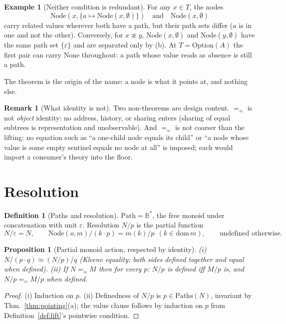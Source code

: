 \documentclass[11pt]{article}
\newtheorem{proposition}[theorem]{Proposition}
\theoremstyle{definition}
\newtheorem{definition}[theorem]{Definition}
\newtheorem{example}[theorem]{Example}
\newtheorem{remark}[theorem]{Remark}
\newcommand{\Bytes}{\mathbb{B}}                    %
\newcommand{\dom}{\mathrm{dom}\,}
\newcommand{\eqS}{=_{\approx}}                     %
\newcommand{\Paths}{\mathrm{Paths}}
\begin{document}
\begin{example}[Neither condition is redundant]
For any $x \in T$, the nodes
\[
\mathrm{Node}(x, \{a \mapsto \mathrm{Node}(x, \emptyset)\})
\quad\text{and}\quad \mathrm{Node}(x, \emptyset)
\]
carry related values wherever both have a path, but their path sets differ ($a$ is in
one and not the other). Conversely, for $x \not\approx y$, $\mathrm{Node}(x, \emptyset)$
and $\mathrm{Node}(y, \emptyset)$ have the same path set $\{\varepsilon\}$ and are
separated only by (b). At $T = \mathrm{Option}(A)$ the first pair can carry
$\mathrm{None}$ throughout: a path whose value reads as absence is still a path.
\end{example}

The theorem is the origin of the name: a node is what it points at, and nothing else.

\begin{remark}[What identity is not]
Two non-theorems are design content. $\eqS$ is not \emph{object} identity: no address,
history, or sharing enters (sharing of equal subtrees is representation and
unobservable). And $\eqS$ is not coarser than the lifting: no equation such as
``a one-child node equals its child'' or ``a node whose value is some empty sentinel
equals no node at all'' is imposed; each would import a consumer's
theory into the floor.
\end{remark}

\section{Resolution}\label{sec:path}

\begin{definition}[Paths and resolution]\label{def:path}
$\mathrm{Path} = \Bytes^{*}$, the free monoid under concatenation with unit
$\varepsilon$. Resolution $N/p$ is the partial function
\[
N/\varepsilon = N,\qquad
\mathrm{Node}(o, m)/(k \cdot p) = m(k)/p \ \ (k \in \dom m),\qquad
\text{undefined otherwise.}
\]
\end{definition}

\begin{proposition}[Partial monoid action, respected by identity]\label{prop:action}
(i) $N/(p \cdot q) \simeq (N/p)/q$ (Kleene equality: both sides defined together and
equal when defined). (ii) If $N \eqS M$ then for every $p$: $N/p$ is defined iff
$M/p$ is, and $N/p \eqS M/p$ when defined.
\end{proposition}

\begin{proof}
(i) Induction on $p$. (ii) Definedness of $N/p$ is $p \in \Paths(N)$, invariant by
Thm.~\ref{thm:pointing}(a); the value clause follows by induction on $p$ from
Definition~\ref{def:lift}'s pointwise condition.
\end{proof}
\end{document}
